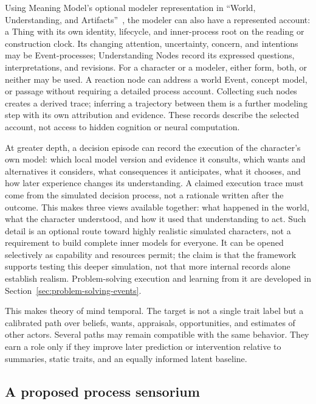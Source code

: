 \documentclass[10pt]{article}
\begin{document}
Using Meaning Model's optional modeler representation in
``World, Understanding, and Artifacts''~\cite{westerbergMeaning2026},
the modeler can also have a represented account: a Thing with its
own identity, lifecycle, and inner-process root on the reading or construction
clock. Its changing attention, uncertainty, concern, and intentions may be
Event-processes; Understanding Nodes record its expressed questions,
interpretations, and revisions. For a character or a modeler, either form,
both, or neither may be used. A reaction node can address a world Event,
concept model, or passage without requiring a detailed process account.
Collecting such nodes creates a derived trace; inferring a trajectory between
them is a further modeling step with its own attribution and evidence.
These records describe the selected account, not access to hidden cognition
or neural computation.

At greater depth, a decision episode can record the execution of the
character's own model: which local model version and evidence it consults,
which wants and alternatives it considers, what consequences it anticipates,
what it chooses, and how later experience changes its understanding. A claimed
execution trace must come from the simulated decision process, not a rationale
written after the outcome. This makes three views available together: what
happened in the world, what the character understood, and how it used that
understanding to act. Such detail is an optional route toward highly realistic
simulated characters, not a requirement to build complete inner models for
everyone. It can be opened selectively as capability and resources permit;
the claim is that the framework supports testing this deeper simulation, not
that more internal records alone establish realism. Problem-solving execution
and learning from it are developed in Section~\ref{sec:problem-solving-events}.

This makes theory of mind temporal. The target is not a single trait label but
a calibrated path over beliefs, wants, appraisals, opportunities, and estimates
of other actors. Several paths may remain compatible with the same behavior.
They earn a role only if they improve later prediction or intervention relative
to summaries, static traits, and an equally informed latent baseline.

\subsection{A proposed process sensorium}
\label{sec:process-sensorium}
\end{document}
